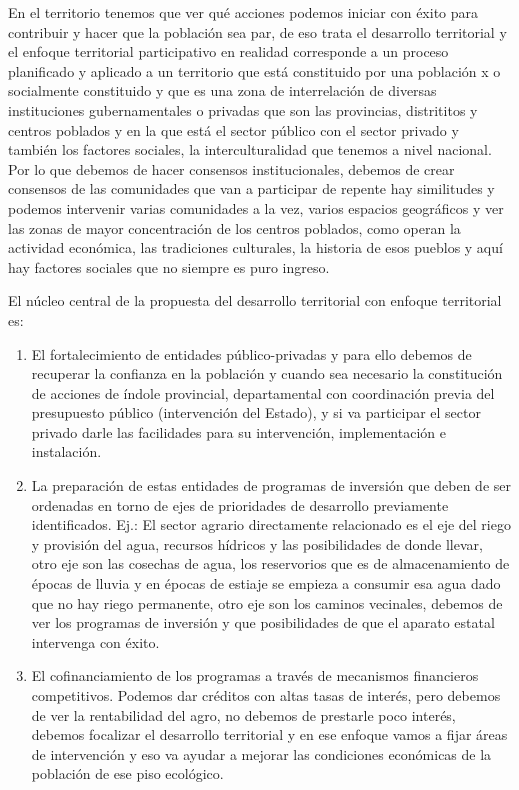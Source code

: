 \documentclass[
  letterpaper,
  DIV=11,
  numbers=noendperiod]{scrartcl}
\providecommand{\tightlist}{%
  \setlength{\itemsep}{0pt}\setlength{\parskip}{0pt}}\usepackage{longtable,booktabs,array}
\begin{document}
En el territorio tenemos que ver qué acciones podemos iniciar con éxito
para contribuir y hacer que la población sea par, de eso trata el
desarrollo territorial y el enfoque territorial participativo en
realidad corresponde a un proceso planificado y aplicado a un territorio
que está constituido por una población x o socialmente constituido y que
es una zona de interrelación de diversas instituciones gubernamentales o
privadas que son las provincias, distrititos y centros poblados y en la
que está el sector público con el sector privado y también los factores
sociales, la interculturalidad que tenemos a nivel nacional. Por lo que
debemos de hacer consensos institucionales, debemos de crear consensos
de las comunidades que van a participar de repente hay similitudes y
podemos intervenir varias comunidades a la vez, varios espacios
geográficos y ver las zonas de mayor concentración de los centros
poblados, como operan la actividad económica, las tradiciones
culturales, la historia de esos pueblos y aquí hay factores sociales que
no siempre es puro ingreso.

El núcleo central de la propuesta del desarrollo territorial con enfoque
territorial es:

\begin{enumerate}
\def\labelenumi{\arabic{enumi}.}
\tightlist
\item
  El fortalecimiento de entidades público-privadas y para ello debemos
  de recuperar la confianza en la población y cuando sea necesario la
  constitución de acciones de índole provincial, departamental con
  coordinación previa del presupuesto público (intervención del Estado),
  y si va participar el sector privado darle las facilidades para su
  intervención, implementación e instalación.
\item
  La preparación de estas entidades de programas de inversión que deben
  de ser ordenadas en torno de ejes de prioridades de desarrollo
  previamente identificados. Ej.: El sector agrario directamente
  relacionado es el eje del riego y provisión del agua, recursos
  hídricos y las posibilidades de donde llevar, otro eje son las
  cosechas de agua, los reservorios que es de almacenamiento de épocas
  de lluvia y en épocas de estiaje se empieza a consumir esa agua dado
  que no hay riego permanente, otro eje son los caminos vecinales,
  debemos de ver los programas de inversión y que posibilidades de que
  el aparato estatal intervenga con éxito.
\item
  El cofinanciamiento de los programas a través de mecanismos
  financieros competitivos. Podemos dar créditos con altas tasas de
  interés, pero debemos de ver la rentabilidad del agro, no debemos de
  prestarle poco interés, debemos focalizar el desarrollo territorial y
  en ese enfoque vamos a fijar áreas de intervención y eso va ayudar a
  mejorar las condiciones económicas de la población de ese piso
  ecológico.
\end{enumerate}
\end{document}

